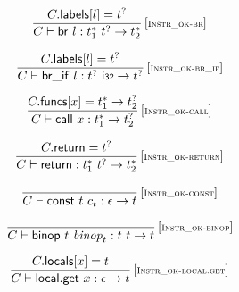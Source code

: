 \documentclass{article}
\begin{document}
\vspace{1ex}

$$
\begin{array}{@{}c@{}}\displaystyle
	\frac{
		C{.}\mathsf{labels}{}[l] = {t^?}
	}{
		C \vdash \mathsf{br}~l : {t_1^\ast}~{t^?} \rightarrow {t_2^\ast}
	} \, {[\textsc{\scriptsize Instr\_ok{-}br}]}
	\qquad
\end{array}
$$

$$
\begin{array}{@{}c@{}}\displaystyle
	\frac{
		C{.}\mathsf{labels}{}[l] = {t^?}
	}{
		C \vdash \mathsf{br\_if}~l : {t^?}~\mathsf{i{\scriptstyle 32}} \rightarrow {t^?}
	} \, {[\textsc{\scriptsize Instr\_ok{-}br\_if}]}
	\qquad
\end{array}
$$

\vspace{1ex}

$$
\begin{array}{@{}c@{}}\displaystyle
	\frac{
		C{.}\mathsf{funcs}{}[x] = {t_1^\ast} \rightarrow {t_2^?}
	}{
		C \vdash \mathsf{call}~x : {t_1^\ast} \rightarrow {t_2^?}
	} \, {[\textsc{\scriptsize Instr\_ok{-}call}]}
	\qquad
\end{array}
$$

$$
\begin{array}{@{}c@{}}\displaystyle
	\frac{
		C{.}\mathsf{return} = {t^?}
	}{
		C \vdash \mathsf{return} : {t_1^\ast}~{t^?} \rightarrow {t_2^\ast}
	} \, {[\textsc{\scriptsize Instr\_ok{-}return}]}
	\qquad
\end{array}
$$

\vspace{1ex}

$$
\begin{array}{@{}c@{}}\displaystyle
	\frac{
	}{
		C \vdash \mathsf{const}~t~c_t : \epsilon \rightarrow t
	} \, {[\textsc{\scriptsize Instr\_ok{-}const}]}
	\qquad
\end{array}
$$

$$
\begin{array}{@{}c@{}}\displaystyle
	\frac{
	}{
		C \vdash \mathsf{binop}~t~{\mathit{binop}}_t : t~t \rightarrow t
	} \, {[\textsc{\scriptsize Instr\_ok{-}binop}]}
	\qquad
\end{array}
$$

\vspace{1ex}

$$
\begin{array}{@{}c@{}}\displaystyle
	\frac{
		C{.}\mathsf{locals}{}[x] = t
	}{
		C \vdash \mathsf{local.get}~x : \epsilon \rightarrow t
	} \, {[\textsc{\scriptsize Instr\_ok{-}local.get}]}
	\qquad
\end{array}
$$
\end{document}
